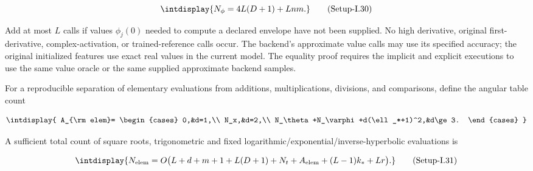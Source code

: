 \label{int:eq-setup-i-30}
\begingroup\renewcommand{\theHequation}{intdisplay.1114}
\begin{equation}
\intdisplay{
N_\phi=4L(D+1)+Lnm.
}
\tag{Setup-I.30}
\label{int:eq-0598-setup-i-30}
\end{equation}
\endgroup


Add at most \(L\) calls if values \(\phi_j(0)\) needed to compute a declared envelope have not been supplied. No high derivative, original first-derivative, complex-activation, or trained-reference calls occur. The backend's approximate value calls may use its specified accuracy; the original initialized features use exact real values in the current model. The equality proof requires the implicit and explicit executions to use the same value oracle or the same supplied approximate backend samples.



For a reproducible separation of elementary evaluations from additions, multiplications, divisions, and comparisons, define the angular table count


\begingroup\renewcommand{\theHequation}{intdisplay.1115}
\begin{equation*}
\intdisplay{
A_{\rm elem}=
\begin{cases}
0,&d=1,\\
N_x,&d=2,\\
N_\theta+N_\varphi+d(\ell_*+1)^2,&d\ge3.
\end{cases}
}
\end{equation*}
\endgroup


A sufficient total count of square roots, trigonometric and fixed logarithmic/exponential/inverse-hyperbolic evaluations is


\label{int:eq-setup-i-31}
\begingroup\renewcommand{\theHequation}{intdisplay.1116}
\begin{equation}
\intdisplay{
N_{\rm elem}
=O\bigl(L+d+m+1+L(D+1)+N_t+A_{\rm elem}
             +(L-1)k_*+Lr\bigr).
}
\tag{Setup-I.31}
\label{int:eq-0599-setup-i-31}
\end{equation}
\endgroup


